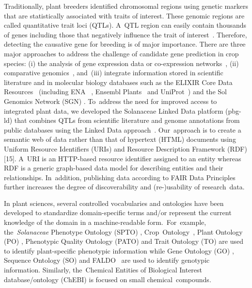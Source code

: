 \documentclass[applsci,article,accept,moreauthors,pdftex]{Definitions/mdpi}
\begin{document}
Traditionally, plant breeders identified chromosomal regions using genetic markers that are statistically associated with traits of interest. These genomic regions are called quantitative trait loci (QTLs). A~QTL region can easily contain thousands of genes including those that negatively influence the trait of interest~\cite{chibon2012marker2sequence}. Therefore, detecting the causative gene for breeding is of major importance. There are three major approaches to address the challenge of candidate gene prediction in crop species: (i) the analysis of gene expression data or co-expression networks~\cite{astola2014inferring}, (ii) comparative genomics~\cite{shinozuka2012quantitative}, and~(iii) integrate information stored in scientific literature and in molecular biology databases such as the ELIXIR Core Data Resources~\cite{durinx2016identifying} (including ENA %
~\cite{harrison2018european}, Ensembl Plants~\cite{bolser2017ensembl} and UniProt~\cite{pundir2017uniprot}) and the Sol Genomics Network (SGN) \cite{mueller2005sol}. To~address the need for improved access to integrated plant data, we developed the Solanaceae Linked Data platform (pbg-ld) \cite{Kuzniarpbgld} that combines QTLs from scientific literature and genome annotations from public databases using the Linked Data approach~\cite{Berners-Lee2006}. Our~approach is to create a semantic web of data rather than that of hypertext (HTML) documents using Uniform Resource Identifiers (URIs) and Resource Description Framework (RDF) [15]. A~URI is an HTTP-based resource identifier assigned to an entity whereas RDF is a generic graph-based data model for describing entities and their relationships. In~addition, publishing data according to FAIR Data Principles~\cite{wilkinson2016fair} further increases the degree of discoverability and (re-)usability of research~data.

In plant sciences, several controlled vocabularies and ontologies have been developed to standardize domain-specific terms and/or represent the current knowledge of the domain in a machine-readable form.~For~example, the~\textit{Solanaceae} %
Phenotype Ontology (SPTO) \cite{SPTO}, Crop~Ontology~\cite{CO}, Plant Ontology (PO) \cite{doi:10.1093/pcp/pcs163}, Phenotypic Quality Ontology (PATO) \cite{Walls2012} and Trait Ontology (TO) \cite{TO} are used to identify plant-specific phenotypic information while Gene Ontology (GO) \cite{GOontology}, Sequence Ontology (SO) \cite{Eilbeck2005} and FALDO~\cite{FALDO} are used to identify genotypic information. Similarly, the~Chemical Entities of Biological Interest database/ontology (ChEBI) \cite{Hastings2013} is focused on small chemical~compounds. 
\end{document}
